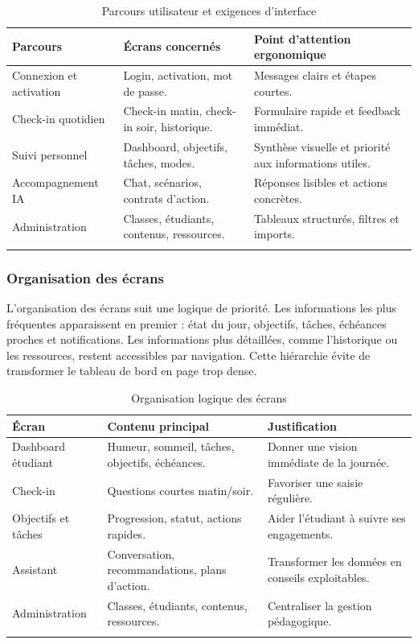 \documentclass{rapportENSET}
\begin{document}
\begin{longtable}{@{}L{0.25\textwidth}L{0.37\textwidth}L{0.28\textwidth}@{}}
\toprule
\textbf{Parcours} & \textbf{Écrans concernés} & \textbf{Point d'attention ergonomique} \\
\midrule
\endhead
Connexion et activation & Login, activation, mot de passe. & Messages clairs et étapes courtes. \\
Check-in quotidien & Check-in matin, check-in soir, historique. & Formulaire rapide et feedback immédiat. \\
Suivi personnel & Dashboard, objectifs, tâches, modes. & Synthèse visuelle et priorité aux informations utiles. \\
Accompagnement IA & Chat, scénarios, contrats d'action. & Réponses lisibles et actions concrètes. \\
Administration & Classes, étudiants, contenus, ressources. & Tableaux structurés, filtres et imports. \\
\bottomrule
\caption{Parcours utilisateur et exigences d'interface}
\end{longtable}

\subsubsection*{Organisation des écrans}
L'organisation des écrans suit une logique de priorité. Les informations les plus fréquentes apparaissent en premier : état du jour, objectifs, tâches, échéances proches et notifications. Les informations plus détaillées, comme l'historique ou les ressources, restent accessibles par navigation. Cette hiérarchie évite de transformer le tableau de bord en page trop dense.

\begin{longtable}{@{}L{0.24\textwidth}L{0.34\textwidth}L{0.32\textwidth}@{}}
\toprule
\textbf{Écran} & \textbf{Contenu principal} & \textbf{Justification} \\
\midrule
\endhead
Dashboard étudiant & Humeur, sommeil, tâches, objectifs, échéances. & Donner une vision immédiate de la journée. \\
Check-in & Questions courtes matin/soir. & Favoriser une saisie régulière. \\
Objectifs et tâches & Progression, statut, actions rapides. & Aider l'étudiant à suivre ses engagements. \\
Assistant & Conversation, recommandations, plans d'action. & Transformer les données en conseils exploitables. \\
Administration & Classes, étudiants, contenus, ressources. & Centraliser la gestion pédagogique. \\
\bottomrule
\caption{Organisation logique des écrans}
\end{longtable}
\end{document}
